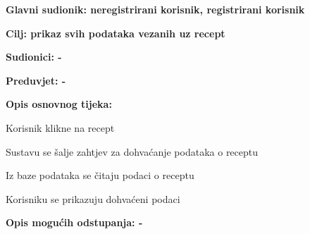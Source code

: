 					\noindent {}
					\begin{packed_item}
						\item \textbf{Glavni sudionik: neregistrirani korisnik, registrirani korisnik}
						\item  \textbf{Cilj: prikaz svih podataka vezanih uz recept}
						\item  \textbf{Sudionici: -}
						\item  \textbf{Preduvjet: -}
						
						\item  \textbf{Opis osnovnog tijeka:}
						\item[] \begin{packed_enum}
							\item Korisnik klikne na recept
							\item Sustavu se šalje zahtjev za dohvaćanje podataka o receptu
							\item Iz baze podataka se čitaju podaci o receptu
							\item Korisniku se prikazuju dohvaćeni podaci
						\end{packed_enum}
						
						\item  \textbf{Opis mogućih odstupanja: -}
						\item[] \begin{packed_item}							
						\end{packed_item}
					\end{packed_item}
					
					
					
